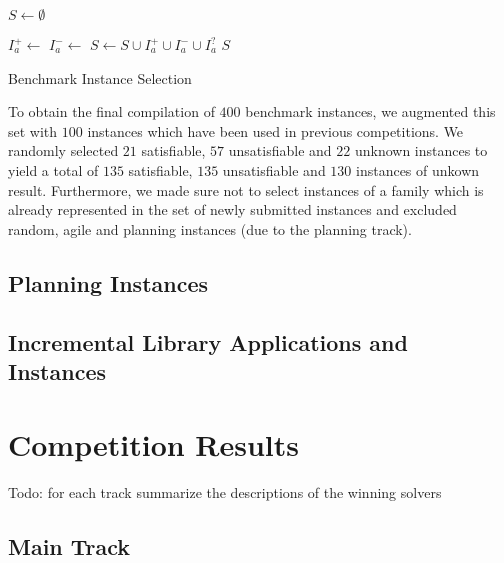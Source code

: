 \documentclass{elsarticle}
\newcommand{\todo}[1]{{\color{purple}Todo: #1}}
\begin{document}
\begin{algorithm}[t]
\DontPrintSemicolon

\BlankLine
$S \leftarrow \emptyset$\;

 {
	$I_a^+ \leftarrow$ \;	
	$I_a^- \leftarrow$ \;	
	$S \leftarrow S \cup I_a^+ \cup I_a^- \cup I_a^?$\;	
}
\Return $S$\;

\caption{Benchmark Instance Selection}
\label{algo:select}
\end{algorithm}

To obtain the final compilation of $400$ benchmark instances, we augmented this set with $100$ instances which have been used in previous competitions. 
We randomly selected $21$ satisfiable, $57$ unsatisfiable and $22$ unknown instances to yield a total of $135$ satisfiable, $135$ unsatisfiable and $130$ instances of unkown result. 
Furthermore, we made sure not to select instances of a family which is already represented in the set of newly submitted instances and excluded random, agile and planning instances (due to the planning track). 


\subsection{Planning Instances}

\subsection{Incremental Library Applications and Instances}


\section{Competition Results}
\todo{for each track summarize the descriptions of the winning solvers}

\subsection{Main Track}
\end{document}
